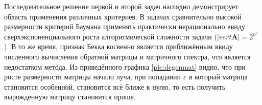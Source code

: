 Последовательное решение первой и второй задач наглядно демонстрирует область применения различных критериев. В задачах сравнительно высокой размерности критерий Баумана применять практически нерационально ввиду сверхэкспоненциального роста алгоритмической сложности задачи ($|vert \mathbf{A}| = 2 ^ {n ^ 2}$). В то же время, признак Бекка косвенно является приближённым ввиду численного вычисления обратной матрицы и матричного спектра, что является недостатком метода.
Из приведённого графика \ref{pic:degenmat} видно, что при росте размерности матрицы начало луча, при попадании $\varepsilon$ в который матрица становится особенной, становится всё ближе к нулю, то есть получить вырожденную матрицу становится проще.